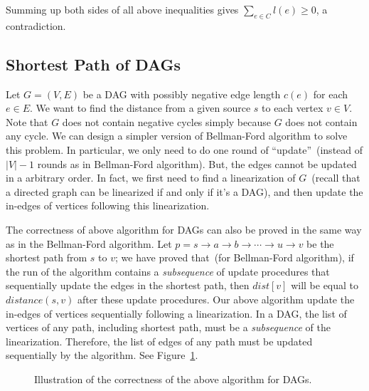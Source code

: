Summing up both sides of all above inequalities gives $\sum_{e\in C} l(e) \ge 0$, a contradiction.


\subsection*{Shortest Path of DAGs}

Let $G = (V, E)$ be a DAG with possibly negative edge length $c(e)$ for each $e\in E$.
We want to find the distance from a given source $s$ to each vertex $v\in V$.
Note that $G$ does not contain negative cycles simply because $G$ does not contain any cycle.
We can design a simpler version of Bellman-Ford algorithm to solve this problem.
In particular, we only need to do one round of ``update''~(instead of $|V|-1$ rounds as in Bellman-Ford algorithm).
But, the edges cannot be updated in a arbitrary order. In fact,
we first need to find a linearization of $G$~(recall that a directed graph can be linearized if and only if it's a DAG),
and then update the in-edges of vertices following this linearization.


\begin{minipage}{0.8\textwidth}
	\xxx
	\xxx
	\xxx
	\xxx
	\xxx
	\xxx
	\xxx
	\xxx
	\xxx
	\xxx
\end{minipage}


The correctness of above algorithm for DAGs can also be proved in the same way as in the Bellman-Ford algorithm.
Let $p = s \to a \to b \to \cdots \to u \to v$ be the shortest path from $s$ to $v$;
we have proved that~(for Bellman-Ford algorithm), if the run of the algorithm contains a \emph{subsequence} of update procedures
that sequentially update the edges in the shortest path, then 
$dist[v]$ will be equal to $distance(s,v)$ after these update procedures.
Our above algorithm update the in-edges of vertices sequentially following a linearization.
In a DAG, the list of vertices of any path, including shortest path, must be a \emph{subsequence}
of the linearization. Therefore, the list of edges of any path must be updated
sequentially by the algorithm. See Figure~\ref{fig:dag}.

\begin{figure}[h]
\centering{}
\caption{Illustration of the correctness of the above algorithm for DAGs.}
\label{fig:dag}
\end{figure}
